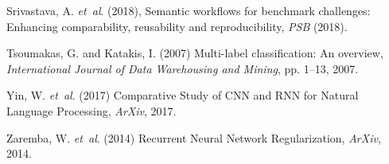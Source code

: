 \documentclass{bioinfo}
\begin{document}
\begin{thebibliography}{}
Srivastava, A. {\it et~al}. (2018), Semantic workflows for benchmark challenges: Enhancing comparability, reusability and reproducibility, {\it PSB} (2018).

 Tsoumakas, G. and Katakis, I. (2007) Multi-label classification: An overview, {\it International Journal of Data Warehousing and Mining}, pp. 1--13, 2007.

Yin, W. {\it et~al}. (2017) Comparative Study of {CNN} and {RNN} for Natural Language Processing, {\it ArXiv}, 2017.

Zaremba, W. {\it et~al}. (2014) Recurrent Neural Network Regularization, {\it ArXiv}, 2014.

\end{thebibliography}
\end{document}
